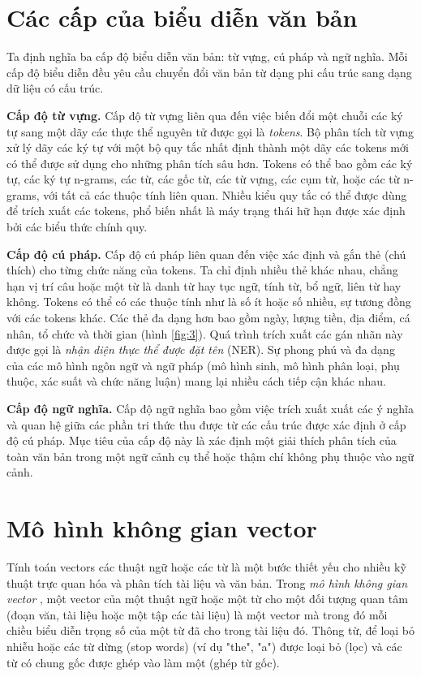 \documentclass[14pt, a4paper]{article}
\numberwithin{equation}{section}
\numberwithin{figure}{section}
\numberwithin{dl}{section}
\numberwithin{md}{section}
\numberwithin{bd}{section}
\numberwithin{dn}{section}
\numberwithin{hq}{section}
\begin{document}
    \section{Các cấp của biểu diễn văn bản}

    Ta định nghĩa ba cấp độ biểu diễn văn bản: từ vựng, cú pháp và ngữ nghĩa.
    Mỗi cấp độ biểu diễn đều yêu cầu chuyển đổi văn bản từ dạng phi cấu trúc sang dạng dữ liệu có cấu trúc.

    \textbf{Cấp độ từ vựng.} Cấp độ từ vựng liên qua đến việc biến đổi một chuỗi các ký tự sang một dãy các thực thể nguyên tử được gọi là \textit{tokens}.
    Bộ phân tích từ vựng xử lý dãy các ký tự với một bộ quy tắc nhất định thành một dãy các tokens mới có thể được sử dụng cho những phân tích sâu hơn.
    Tokens có thể bao gồm các ký tự, các ký tự n-grams, các từ, các gốc từ, các từ vựng, các cụm từ, hoặc các từ n-grams, với tất cả các thuộc tính liên quan.
    Nhiều kiểu quy tắc có thể được dùng để trích xuất các tokens, phổ biến nhất là máy trạng thái hữ hạn được xác định bởi các biểu thức chính quy.

    \textbf{Cấp độ cú pháp.} Cấp độ cú pháp liên quan đến việc xác định và gắn thẻ (chú thích) cho từng chức năng của tokens.
    Ta chỉ định nhiều thẻ khác nhau, chẳng hạn vị trí câu hoặc một từ là danh từ hay tục ngữ, tính từ, bổ ngữ, liên từ hay không.
    Tokens có thể có các thuộc tính như là số ít hoặc số nhiều, sự tương đồng với các tokens khác.
    Các thẻ đa dạng hơn bao gồm ngày, lượng tiền, địa điểm, cá nhân, tổ chức và thời gian (hình \ref{fig:3}).
    Quá trình trích xuất các gán nhãn này được gọi là \textit{nhận diện thực thể được đặt tên} (NER).
    Sự phong phú và đa dạng của các mô hình ngôn ngữ và ngữ pháp (mô hình sinh, mô hình phân loại, phụ thuộc, xác suất và chức năng luận) mang lại nhiều cách tiếp cận khác nhau.

    \textbf{Cấp độ ngữ nghĩa.} Cấp độ ngữ nghĩa bao gồm việc trích xuất xuất các ý nghĩa và quan hệ giữa các phần tri thức thu được từ các cấu trúc được xác định ở cấp độ cú pháp.
    Mục tiêu của cấp độ này là xác định một giải thích phân tích của toàn văn bản trong một ngữ cảnh cụ thể hoặc thậm chí không phụ thuộc vào ngữ cảnh.

    \section{Mô hình không gian vector}

    Tính toán vectors các thuật ngữ hoặc các từ là một bước thiết yếu cho nhiều kỹ thuật trực quan hóa và phân tích tài liệu và văn bản.
    Trong \textit{mô hình không gian vector} \cite{356}, một vector của một thuật ngữ hoặc một từ cho một đối tượng quan tâm (đoạn văn, tài liệu hoặc một tập các tài liệu) là một vector mà trong đó mỗi chiều biểu diễn trọng số của một từ đã cho trong tài liệu đó.
    Thông từ, để loại bỏ nhiễu hoặc các từ dừng (stop words) (ví dụ "the", "a") được loại bỏ (lọc) và các từ có chung gốc được ghép vào làm một (ghép từ gốc).
\end{document}
